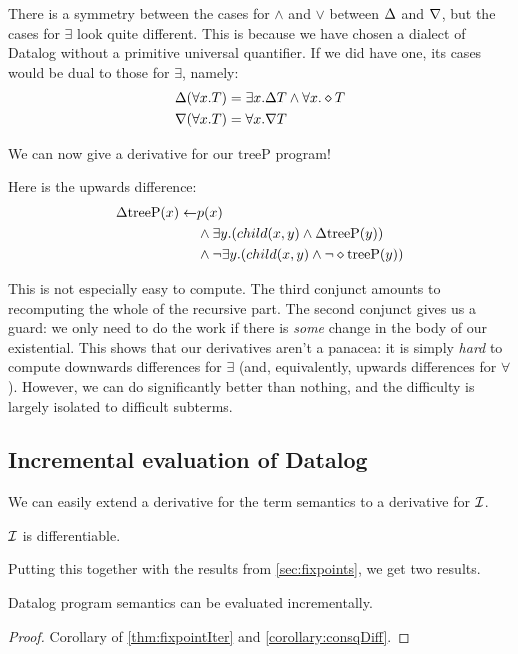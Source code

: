 There is a symmetry between the cases for $\wedge$ and $\vee$ between $\Delta$
and $\nabla$, but the cases for $\exists$ look quite different.
This is because we have chosen a dialect of Datalog without a primitive universal quantifier.
If we did have one, its cases would be dual to those for $\exists$, namely:
\begin{align*}
\Delta(\forall x.T) &= \exists x. \Delta T \wedge \forall x. \diamond T\\
\nabla(\forall x.T) &= \forall x. \nabla T
\end{align*}

We can now give a derivative for our $\mathrm{treeP}$ program!

Here is the upwards difference:
\begin{align*}
  \Delta \mathrm{treeP}(x) \leftarrow & p(x)\\
    &\wedge
    \exists y. (
      child(x, y)
      \wedge
      \Delta \mathrm{treeP}(y)
    )\\
    &\wedge 
    \neg \exists y. (
      child(x, y)
      \wedge
      \neg \diamond \mathrm{treeP}(y)
    )
\end{align*}

This is not especially easy to compute. The third conjunct amounts to
recomputing the whole of the recursive part. The second conjunct gives us a
guard: we only need to do the work if there is \emph{some} change in the body of
our existential. This shows that our derivatives aren't a panacea: it is simply \emph{hard} to compute
downwards differences for $\exists$ (and, equivalently, upwards differences for
$\forall$). However, we can do significantly better than nothing, and the
difficulty is largely isolated to difficult subterms.

\subsection{Incremental evaluation of Datalog}

We can easily extend a derivative for the term semantics to a derivative for $\mathcal{I}$.

\begin{corollary}
\label{corollary:consqDiff}
  $\mathcal{I}$ is differentiable.
\end{corollary}

Putting this together with the results from \cref{sec:fixpoints}, we get two results.

\begin{thm}
\label{thm:diffEval}
  Datalog program semantics can be evaluated incrementally.
\end{thm}
\ifproofs
\begin{proof}
  Corollary of \cref{thm:fixpointIter} and \cref{corollary:consqDiff}.
\end{proof}
\fi

